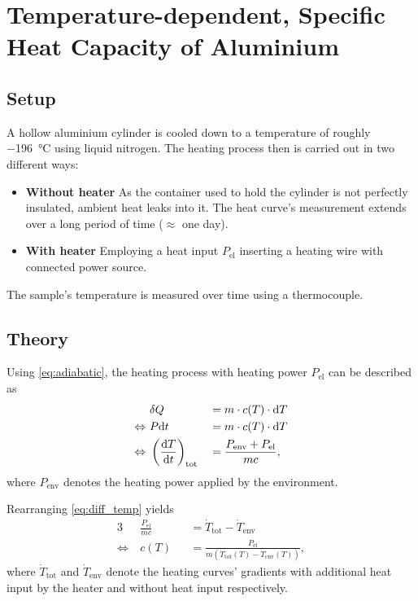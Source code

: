 \chapter{Temperature-dependent, Specific Heat Capacity of Aluminium}
\section{Setup}
A hollow aluminium cylinder is cooled down to a temperature of roughly \SI{-196}{\celsius} using liquid nitrogen.
The heating process then is carried out in two different ways:
\begin{itemize}
	\item \textbf{Without heater} As the container used to hold the cylinder is not perfectly insulated, ambient heat leaks into it. The heat curve's measurement extends over a long period of time ($\approx$ one day).
	\item \textbf{With heater} Employing a heat input $P_\text{el}$ inserting a heating wire with connected power source.
\end{itemize}
The sample's temperature is measured over time using a thermocouple.

\section{Theory}
Using \autoref{eq:adiabatic}, the heating process with heating power $P_\text{el}$ can be described as
\begin{alignat}{3}
										&\delta Q 																	&&= m\cdot c(T)\cdot\text{d} T \nonumber \\
	\Leftrightarrow\ 	&P\text{d} t																			&&= m\cdot c(T)\cdot\text{d} T \nonumber \\
	\Leftrightarrow\ 	&\left(\frac{\text{d} T}{\text{d} t}\right)_\text{tot}	&&= \frac{P_\text{env}+P_\text{el}}{mc}, \label{eq:diff_temp}
\end{alignat}
where $P_\text{env}$ denotes the heating power applied by the environment.

Rearranging \autoref{eq:diff_temp} yields
\begin{alignat}{3}
										& \frac{P_\text{el}}{mc}	&&=\dot{T}_\text{tot}-\dot{T}_\text{env} \nonumber \\
	\Leftrightarrow\	& c(T)										&&=\frac{P_\text{el}}{m\left(\dot{T}_\text{tot}(T)-\dot{T}_\text{env}(T)\right)}, \label{eq:cap_temp}
\end{alignat}
where $\dot{T}_\text{tot}$ and $\dot{T}_\text{env}$ denote the heating curves' gradients with additional heat input by the heater and without heat input respectively.

